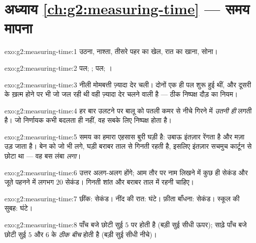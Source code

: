 \section*{अध्याय \ref{ch:g2:measuring-time} --- समय मापना}

\begin{solution}{exo:g2:measuring-time:1}
उठना, नाश्ता, तीसरे पहर का खेल, रात का खाना, सोना।
\end{solution}

\begin{solution}{exo:g2:measuring-time:2}
पल; ; पल; ।
\end{solution}

\begin{solution}{exo:g2:measuring-time:3}
नीली मोमबत्ती ज़्यादा देर चली। दोनों एक ही पल शुरू हुई थीं, और दूसरी
के ख़त्म होने पर भी जो जल रही थी वही ज़्यादा देर चलने वाली है ---
ठीक निष्पक्ष दौड़ का नियम।
\end{solution}

\begin{solution}{exo:g2:measuring-time:4}
हर बार उलटने पर बालू को पतली कमर से नीचे गिरने में \emph{उतनी ही}
 लगती है। जो निर्णायक कभी बदलता ही नहीं, वह सबके लिए निष्पक्ष
होता है।
\end{solution}

\begin{solution}{exo:g2:measuring-time:5}
समय का हमारा एहसास बुरी घड़ी है: उबाऊ इंतज़ार रेंगता है और मज़ा उड़
जाता है। बेन को जो भी लगे, घड़ी बराबर ताल से गिनती रहती है, इसलिए
इंतज़ार सचमुच कार्टून से छोटा था --- वह बस लंबा \emph{लगा}।
\end{solution}

\begin{solution}{exo:g2:measuring-time:6}
उत्तर अलग-अलग होंगे; आम तौर पर नाम लिखने में कुछ ही सेकंड और जूते
पहनने में लगभग $20$ सेकंड। गिनती शांत और बराबर ताल में रहनी चाहिए।
\end{solution}

\begin{solution}{exo:g2:measuring-time:7}
छींक: सेकंड। नींद की रात: घंटे। फ़ीता बाँधना: सेकंड। स्कूल की सुबह:
घंटे।
\end{solution}

\begin{solution}{exo:g2:measuring-time:8}
पाँच बजे छोटी सुई $5$ पर होती है (बड़ी सुई सीधी ऊपर); साढ़े पाँच बजे
छोटी सुई $5$ और $6$ के \emph{ठीक बीच} होती है (बड़ी सुई सीधी नीचे)।
\end{solution}

